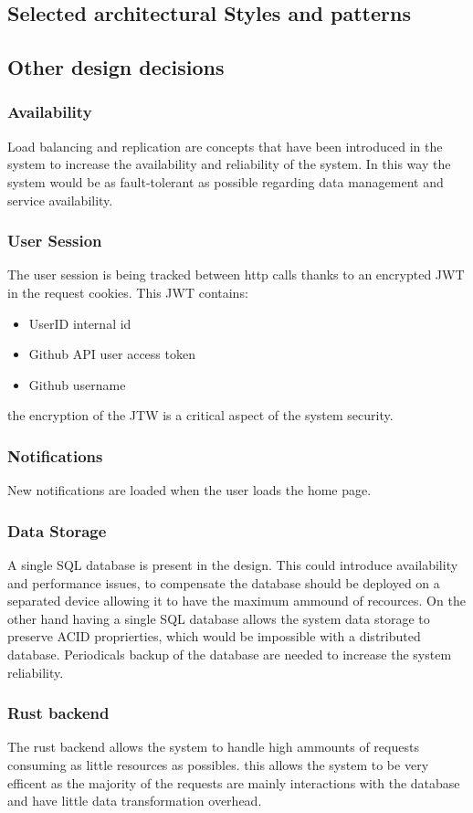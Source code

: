 \documentclass{article}
\begin{document}
\subsection{Selected architectural Styles and patterns}

\subsection{Other design decisions}
\subsubsection{Availability}
Load balancing and replication are concepts that have been introduced in the system to
increase the availability and reliability of the system. In this way the system would be as
fault-tolerant as possible regarding data management and service availability.
\subsubsection{User Session}
The user session is being tracked between http calls thanks to an encrypted JWT in the request cookies. This JWT contains:
\begin{itemize}
\item UserID internal id
\item Github API user access token
\item Github username
\end{itemize}
the encryption of the JTW is a critical aspect of the system security.
\subsubsection{Notifications}
New notifications are loaded when the user loads the home page.
\subsubsection{Data Storage}
A single SQL database is present in the design. This could introduce availability and performance issues, to compensate the database should be deployed on a separated device allowing it to have the maximum ammound of recources. On the other hand having a single SQL database allows the system data storage to preserve ACID proprierties, which would be impossible with a distributed database. Periodicals backup of the database are needed to increase the system reliability.
\subsubsection{Rust backend}
The rust backend allows the system to handle high ammounts of requests consuming as little resources as possibles. this allows the system to be very efficent as the majority of the requests are mainly interactions with the database and have little data transformation overhead.
\end{document}
